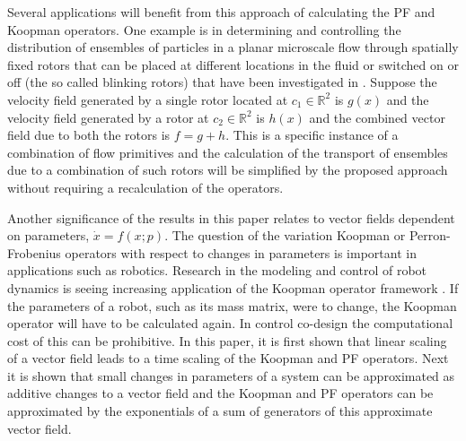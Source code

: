 \documentclass[pdflatex,sn-mathphys]{sn-jnl}%
\theoremstyle{thmstyleone}%
\theoremstyle{thmstyletwo}%
\theoremstyle{thmstylethree}%
\begin{document}
Several applications will benefit from this approach of calculating the PF and Koopman operators. One example is in determining and controlling the distribution of ensembles of particles in a planar microscale flow through spatially fixed rotors that can be placed at different locations in the fluid or switched on or off (the so called blinking rotors) that have been investigated in \cite{bt_cdc_2023, bt_pof_2024, bt_physicad_2025}. Suppose the velocity field generated by a single rotor located at $c_1 \in \mathbb{R}^2$ is $g(x)$ and the velocity field generated by a rotor at $c_2\in \mathbb{R}^2$ is $h(x)$ and the combined vector field due to both the rotors is $f=g+h$. This is a specific instance of a combination of flow primitives and the calculation of the transport of ensembles due to a combination of such rotors will be simplified by the proposed approach without requiring a recalculation of the operators. %

Another significance of the results in this paper relates to vector fields dependent on parameters, $\dot{x} = f(x;p)$. The question of the variation Koopman or Perron-Frobenius operators with respect to changes in parameters is important in applications such as robotics. Research in the modeling and control of robot dynamics is seeing increasing application of the Koopman operator framework \cite{bruder_RAL_2021, haggerty_science_2023, shi_2024}. If the parameters of a robot, such as its mass matrix, were to change, the Koopman operator will have to be calculated again. In control co-design the computational cost of this can be prohibitive. In this paper, it is first shown that linear scaling of a vector field leads to a time scaling of the Koopman and PF operators. Next it is shown that small changes in parameters of a system can be approximated as additive changes to a vector field and the Koopman and PF operators can be approximated by the exponentials of a sum of generators of this approximate vector field.
\end{document}
